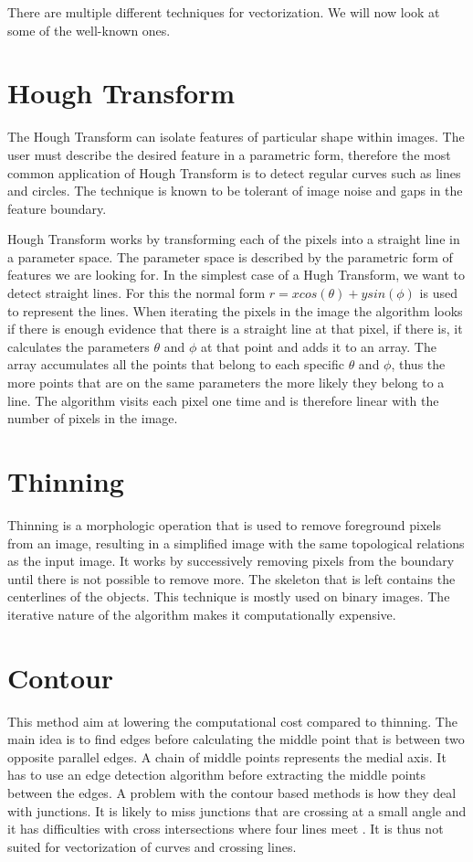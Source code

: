 There are multiple different techniques for vectorization. We will now look at some of the well-known ones.

\section{Hough Transform}
The Hough Transform can isolate features of particular shape within images. The user must describe the desired feature in a parametric form, therefore the most common application of Hough Transform is to detect regular curves such as lines and circles. The technique is known to be tolerant of image noise and gaps in the feature boundary.

Hough Transform works by transforming each of the pixels into a straight line in a parameter space. The parameter space is described by the parametric form of features we are looking for. In the simplest case of a Hugh Transform, we want to detect straight lines. For this the normal form $r = x cos(\theta) + y sin(\phi)$ is used to represent the lines. When iterating the pixels in the image the algorithm looks if there is enough evidence that there is a straight line at that pixel, if there is, it calculates the parameters $\theta$ and $\phi$ at that point and adds it to an array. The array accumulates all the points that belong to each specific $\theta$ and $\phi$, thus the more points that are on the same parameters the more likely they belong to a line. The algorithm visits each pixel one time and is therefore linear with the number of pixels in the image.

\section{Thinning}
Thinning is a morphologic operation that is used to remove foreground pixels from an image, resulting in a simplified image with the same topological relations as the input image. It works by successively removing pixels from the boundary until there is not possible to remove more. The skeleton that is left contains the centerlines of the objects. This technique is mostly used on binary images. The iterative nature of the algorithm makes it computationally expensive.

\section{Contour}
This method aim at lowering the computational cost compared to thinning. The main idea is to find edges before calculating the middle point that is between two opposite parallel edges. A chain of middle points represents the medial axis. It has to use an edge detection algorithm before extracting the middle points between the edges. A problem with the contour based methods is how they deal with junctions. It is likely to miss junctions that are crossing at a small angle and it has difficulties with cross intersections where four lines meet \cite{Wenyin1999}. It is thus not suited for vectorization of curves and crossing lines.

